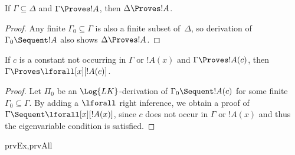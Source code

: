\documentclass[../../include/open-logic-section]{subfiles}
\begin{document}

\begin{prop}[Monotony]
If $\Gamma \subseteq \Delta$ and $\Gamma \Proves !A$, then $\Delta
\Proves !A$.
\end{prop}

\begin{proof}
Any finite $\Gamma_0 \subseteq \Gamma$ is also a finite subset
of~$\Delta$, so derivation of $\Gamma_0 \Sequent !A$ also shows
$\Delta \Proves !A$.
\end{proof}

\begin{thm}
 If $c$ is a constant not occurring
in $\Gamma$ or $!A(x)$ and $\Gamma \Proves !A(c)$, then $\Gamma
\Proves \lforall[x][!A(c)]$.
\end{thm}

\begin{proof}
Let $\Pi_0$ be an $\Log{LK}$-derivation of $\Gamma_0 \Sequent !A(c)$
for some finite $\Gamma_0 \subseteq \Gamma$.  By adding a $\lforall$
right inference, we obtain a proof of $\Gamma \Sequent
\lforall[x][!A(x)]$, since $c$ does not occur in $\Gamma$ or $!A(x)$
and thus the eigenvariable condition is satisfied.
\end{proof}

\begin{thm}
\begin{tagenumerate}{prvEx,prvAll}

\end{tagenumerate}
\end{thm}
\end{document}
